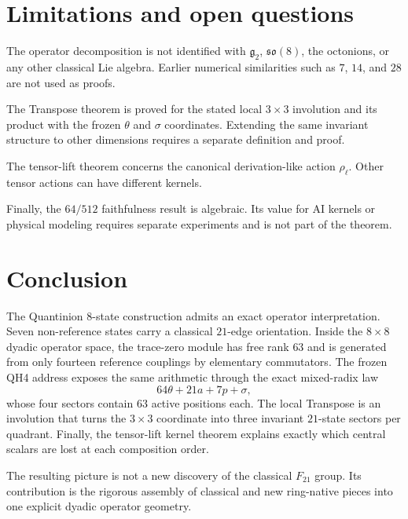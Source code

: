 \documentclass[11pt]{article}
\theoremstyle{definition}
\begin{document}
\section{Limitations and open questions}
The operator decomposition is not identified with $\mathfrak g_2$, $\mathfrak{so}(8)$, the octonions, or any other classical Lie algebra. Earlier numerical similarities such as $7$, $14$, and $28$ are not used as proofs.

The Transpose theorem is proved for the stated local $3\times3$ involution and its product with the frozen $\theta$ and $\sigma$ coordinates. Extending the same invariant structure to other dimensions requires a separate definition and proof.

The tensor-lift theorem concerns the canonical derivation-like action $\rho_\ell$. Other tensor actions can have different kernels.

Finally, the $64/512$ faithfulness result is algebraic. Its value for AI kernels or physical modeling requires separate experiments and is not part of the theorem.

\section{Conclusion}
The Quantinion 8-state construction admits an exact operator interpretation. Seven non-reference states carry a classical $21$-edge orientation. Inside the $8\times8$ dyadic operator space, the trace-zero module has free rank $63$ and is generated from only fourteen reference couplings by elementary commutators. The frozen QH4 address exposes the same arithmetic through the exact mixed-radix law
\[
64\theta+21a+7p+\sigma,
\]
whose four sectors contain $63$ active positions each. The local Transpose is an involution that turns the $3\times3$ coordinate into three invariant $21$-state sectors per quadrant. Finally, the tensor-lift kernel theorem explains exactly which central scalars are lost at each composition order.

The resulting picture is not a new discovery of the classical $F_{21}$ group. Its contribution is the rigorous assembly of classical and new ring-native pieces into one explicit dyadic operator geometry.
\end{document}
